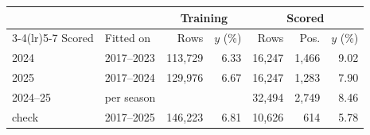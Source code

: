 \begin{tabular}{llrrrrr}
\toprule
 & & \multicolumn{2}{c}{Training} & \multicolumn{3}{c}{Scored} \\
\cmidrule(lr){3-4}\cmidrule(lr){5-7}
Scored & Fitted on & Rows & $y$ (\%) & Rows & Pos. & $y$ (\%) \\
\midrule
2024 & 2017--2023 & 113,729 & 6.33 & 16,247 & 1,466 & 9.02 \\
2025 & 2017--2024 & 129,976 & 6.67 & 16,247 & 1,283 & 7.90 \\
2024--25 & per season & & & 32,494 & 2,749 & 8.46 \\\addlinespace[2pt]
2026 check & 2017--2025 & 146,223 & 6.81 & 10,626 & 614 & 5.78 \\
\bottomrule
\end{tabular}
